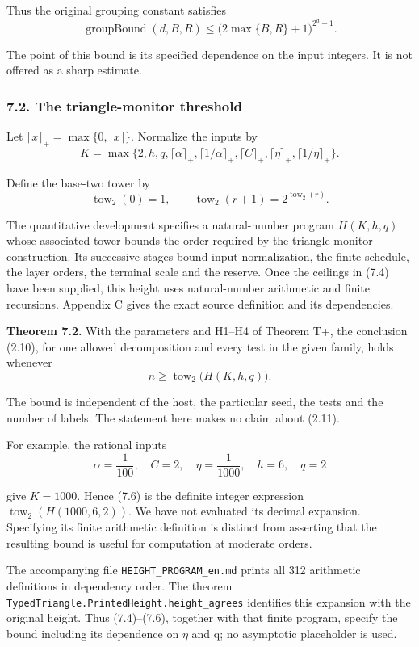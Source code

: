 \documentclass[english,11pt,a4paper]{article}
\begin{document}
Thus the original grouping constant satisfies
\[\operatorname{groupBound}(d,B,R)
\leq\bigl(2\max\{B,R\}+1\bigr)^{2^d-1}.                           \tag{7.3}\]

The point of this bound is its specified dependence on the input integers. It is not offered as a sharp estimate.

\subsubsection{7.2. The triangle-monitor threshold}\label{the-triangle-monitor-threshold}

Let \(\lceil x\rceil_+=\max\{0,\lceil x\rceil\}\). Normalize the inputs by
\[K=\max\{2,h,q,\lceil\alpha\rceil_+,\lceil1/\alpha\rceil_+,
\lceil C\rceil_+,\lceil\eta\rceil_+,\lceil1/\eta\rceil_+\}.          \tag{7.4}\]

Define the base-two tower by
\[\operatorname{tow}_2(0)=1,\qquad
\operatorname{tow}_2(r+1)=2^{\operatorname{tow}_2(r)}.                \tag{7.5}\]

The quantitative development specifies a natural-number program \(H(K,h,q)\) whose associated tower bounds the order required by the triangle-monitor construction. Its successive stages bound input normalization, the finite schedule, the layer orders, the terminal scale and the reserve. Once the ceilings in (7.4) have been supplied, this height uses natural-number arithmetic and finite recursions. Appendix C gives the exact source definition and its dependencies.

\textbf{Theorem 7.2.} With the parameters and H1--H4 of Theorem T+, the conclusion (2.10), for one allowed decomposition and every test in the given family, holds whenever
\[n\geq\operatorname{tow}_2\bigl(H(K,h,q)\bigr).                     \tag{7.6}\]

The bound is independent of the host, the particular seed, the tests and the number of labels. The statement here makes no claim about (2.11).

For example, the rational inputs
\[\alpha=\frac1{100},\quad C=2,\quad\eta=\frac1{1000},
\quad h=6,\quad q=2\]

give \(K=1000\). Hence (7.6) is the definite integer expression \(\operatorname{tow}_2(H(1000,6,2))\). We have not evaluated its decimal expansion. Specifying its finite arithmetic definition is distinct from asserting that the resulting bound is useful for computation at moderate orders.

The accompanying file \texttt{HEIGHT\_\allowbreak{}PROGRAM\_\allowbreak{}en.\allowbreak{}md} prints all 312 arithmetic definitions in dependency order. The theorem \texttt{Typed\allowbreak{}Triangle.\allowbreak{}Printed\allowbreak{}Height.\allowbreak{}height\_\allowbreak{}agrees} identifies this expansion with the original height. Thus (7.4)--(7.6), together with that finite program, specify the bound including its dependence on \(\eta\) and q; no asymptotic placeholder is used.
\end{document}
